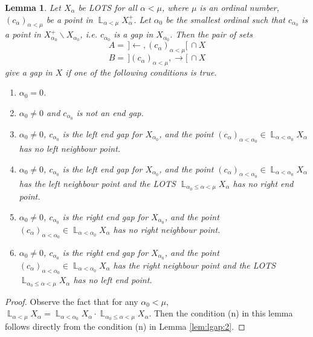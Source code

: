 \documentclass[12pt,oneside,english]{amsbook}
\numberwithin{equation}{section} %
\numberwithin{figure}{section} %
\theoremstyle{plain}
\numberwithin{section}{chapter}
\theoremstyle{plain}
\newtheorem{lem}[thm]{Lemma}
\DeclareMathOperator{\LP}{\mathbb{L}}
\begin{document}
\begin{lem} \label{lem:lgap:3}
  Let $X_{\alpha}$ be LOTS for all $\alpha < \mu$, where $\mu$ is an ordinal number, $(c_{\alpha})_{\alpha < \mu}$ be a point in $\LP_{\alpha < \mu}X_{\alpha}^+$. Let $\alpha_{0}$ be the smallest ordinal such that $c_{\alpha_0}$ is a point in $X_{\alpha_0}^+ \backslash X_{\alpha_0}$, i.e. $c_{\alpha_0}$ is a gap in $X_{\alpha_0}$. Then the pair of sets 
  $$A  = \, ] \leftarrow, (c_{\alpha})_{\alpha < \mu} [ \, \cap X$$
  $$B  = \, ](c_{\alpha})_{\alpha < \mu}, \rightarrow [ \, \cap X$$
  give a gap in $X$ if one of the following conditions is true.
  \begin{enumerate}
  \item $\alpha_{0}  =  0$.
  \item $\alpha_{0} \neq 0$ and $c_{\alpha_{0}}$ is not an end gap.
  \item $\alpha_{0} \neq 0$, $c_{\alpha_{0}}$ is the left end gap for $X_{\alpha_{0}}$, and the point $(c_{\alpha})_{\alpha < \alpha_{0}}  \in \LP_{\alpha < \alpha_{0}} X_{\alpha}$ has no left neighbour point.
  \item $\alpha_{0} \neq 0$, $c_{\alpha_{0}}$ is the left end gap for $X_{\alpha_{0}}$, and the point $(c_{\alpha})_{\alpha < \alpha_{0}}  \in \LP_{\alpha < \alpha_{0}} X_{\alpha}$ has the left neighbour point and the LOTS $\LP_{\alpha_{0} \leq \alpha < \mu} X_{\alpha}$ has no right end point.
  \item $\alpha_{0} \neq 0$, $c_{\alpha_{0}}$ is the right end gap for $X_{\alpha_{0}}$, and the point $(c_{\alpha})_{\alpha < \alpha_{0}}  \in \LP_{\alpha < \alpha_{0}} X_{\alpha}$ has no right neighbour point.
  \item $\alpha_{0} \neq 0$, $c_{\alpha_{0}}$ is the right end gap for $X_{\alpha_{0}}$, and the point $(c_{\alpha})_{\alpha < \alpha_{0}}  \in \LP_{\alpha < \alpha_{0}} X_{\alpha}$ has the right neighbour point and the LOTS  $\LP_{\alpha_{0} \leq \alpha < \mu} X_{\alpha}$ has no left end point.
  \end{enumerate}
\end{lem}

\begin{proof}
  Observe the fact that for any $\alpha_{0} < \mu$, $\LP_{\alpha < \mu} X_{\alpha}  =  \LP_{\alpha < \alpha_{0}} X_{\alpha} \cdot \LP_{\alpha_{0} \leq \alpha < \mu} X_{\alpha}$. Then the condition (n) in this lemma follows directly from the condition (n) in Lemma \ref{lem:lgap:2}.  
\end{proof}
\end{document}
